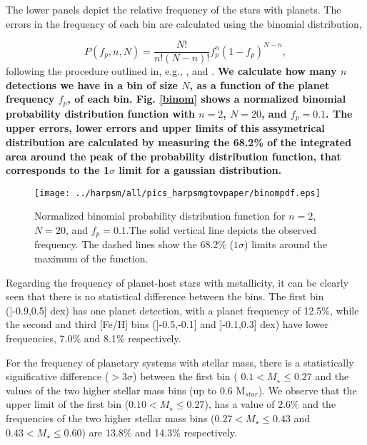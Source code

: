 \documentclass[structabstract]{aa}
\begin{document}
The lower panels depict the relative frequency of the stars with planets. The errors in the frequency of each bin are calculated using the binomial distribution, 

\begin{equation}
P(f_{p},n,N) = \frac{N!}{n!(N-n)!}f^{n}_{p}(1-f_{p})^{N-n},
\label {binom}
\end{equation}
following the procedure outlined in, e.g., \citet[][]{Burgasser-2003,McCarthy-2004, Endl-2006}, and \citet{Sozzetti-2009}. \textbf{We calculate how many $n$ detections we have in a bin of size $N$, as a function of the planet frequency $f_{p}$, of each bin. Fig. \ref{binom} shows a normalized binomial probability distribution function with $n = 2$, $N = 20$, and $f_{p} = 0.1$. The upper errors, lower errors and upper limits of this assymetrical distribution are calculated by measuring the 68.2\% of the integrated area around the peak of the probability distribution function, that corresponds to the 1$\sigma$ limit for a gaussian distribution.} 

\begin{figure}[h]
\begin{center}
\texttt{[image: ../harpsm/all/pics\_harpsmgtovpaper/binompdf.eps]}
\end{center}
\caption{Normalized binomial probability distribution function for $n=2$, $N=20$, and $f_{p} = 0.1$.The solid vertical line depicts the observed frequency. The dashed lines show the 68.2\% ($1\sigma$) limits around the maximum of the function.}
\label{binompdf}
\end{figure}

Regarding the frequency of planet-host stars with metallicity, it can be clearly seen that there is no statistical difference between the bins. The first bin (]-0.9,0.5] dex) has one planet detection, with a planet frequency of 12.5\%, while the second and third [Fe/H] bins (]-0.5,-0.1] and ]-0.1,0.3] dex) have lower frequencies, 7.0\% and 8.1\% respectively. 



For the frequency of planetary systems with stellar mass, there is a statistically significative difference ($> 3\sigma$)  between the first bin ( $0.1 < M_{\star} \le 0.27$ and the values of the two higher stellar mass bins (up to 0.6 M$_{star}$). We observe that the upper limit of the first bin ($0.10 < M_{\star} \le 0.27$), has a value of  2.6\% and the frequencies of the two higher stellar mass bins ($0.27 < M_{\star} \le 0.43$ and $0.43 < M_{\star} \le 0.60$) are 13.8\% and 14.3\% respectively.
\end{document}

